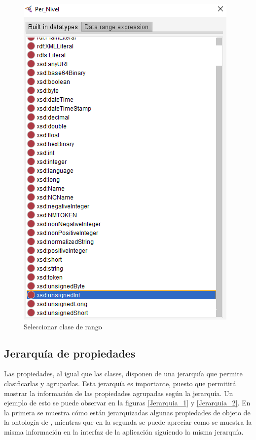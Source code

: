 \begin{enumerate}
    \begin{figure}[ht]
        \centering
        \includegraphics[scale=0.6]{Figures/Protege/CreateDataProp_6.png}
        \caption{Seleccionar clase de rango}
        \label{CreateDataProp_6}
    \end{figure}
\end{enumerate}

\subsection{Jerarquía de propiedades}
Las propiedades, al igual que las clases, disponen de una jerarquía que permite clasificarlas y agruparlas. Esta jerarquía es importante, 
puesto que permitirá mostrar la información de las propiedades agrupadas según la jerarquía. Un ejemplo de esto se puede observar en la 
figuras \ref*{Jerarquia_1} y \ref{Jerarquia_2}. En la primera se muestra cómo están jerarquizadas algunas propiedades de objeto de la ontología de \anima, mientras 
que en la segunda se puede apreciar como se muestra la misma información en la interfaz de la aplicación siguiendo la misma jerarquía.

